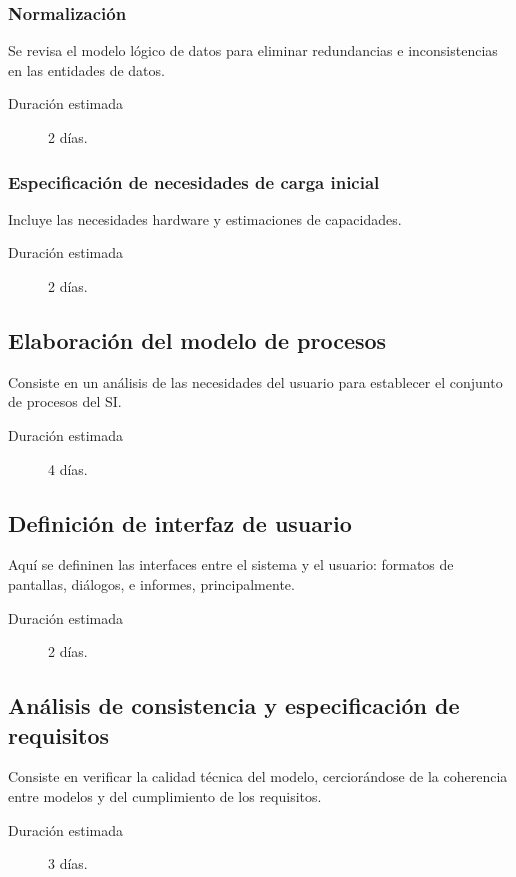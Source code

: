 \documentclass[11pt,a4paper,spanish,twoside]{report}
\begin{document}
\subsubsection{Normalización}
Se revisa el modelo lógico de datos para eliminar redundancias e
inconsistencias en las entidades de datos. 
\begin{description}
\item[Duración estimada] 2 días.
\end{description}

\subsubsection{Especificación de necesidades de carga inicial}
Incluye las necesidades hardware y estimaciones de capacidades.
\begin{description}
\item[Duración estimada] 2 días.
\end{description}

\subsection{Elaboración del modelo de procesos}
Consiste en un análisis de las necesidades del usuario para establecer el
conjunto de procesos del SI. 
\begin{description}
\item[Duración estimada] 4 días.
\end{description}

\subsection{Definición de interfaz de usuario}
Aquí se defininen las interfaces entre el sistema y el usuario: formatos de
pantallas, diálogos, e informes, principalmente. 
    \begin{description}
\item[Duración estimada] 2 días.
\end{description}

\subsection{Análisis de consistencia y especificación de requisitos}
Consiste en verificar la calidad técnica del modelo, cerciorándose de la
coherencia entre modelos y del cumplimiento de los requisitos. 
\begin{description}
\item[Duración estimada] 3 días.
\end{description}
\end{document}
